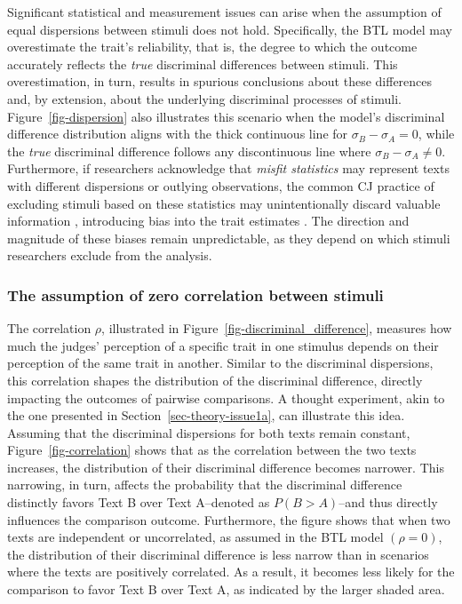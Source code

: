\documentclass[
  authoryear,
  review,
  1p]{elsarticle}
\begin{document}
Significant statistical and measurement issues can arise when the
assumption of equal dispersions between stimuli does not hold.
Specifically, the BTL model may overestimate the trait's reliability,
that is, the degree to which the outcome accurately reflects the
\emph{true} discriminal differences between stimuli. This
overestimation, in turn, results in spurious conclusions about these
differences \citep{McElreath_2020, Wu_et_al_2022} and, by extension,
about the underlying discriminal processes of stimuli.
Figure~\ref{fig-dispersion} also illustrates this scenario when the
model's discriminal difference distribution aligns with the thick
continuous line for \(\sigma_{B}-\sigma_{A}=0\), while the \emph{true}
discriminal difference follows any discontinuous line where
\(\sigma_{B}-\sigma_{A} \neq 0\). Furthermore, if researchers
acknowledge that \emph{misfit statistics} may represent texts with
different dispersions or outlying observations, the common CJ practice
of excluding stimuli based on these statistics may unintentionally
discard valuable information \citep{Miller_2023}, introducing bias into
the trait estimates \citep{Zimmerman_1994, McElreath_2020}. The
direction and magnitude of these biases remain unpredictable, as they
depend on which stimuli researchers exclude from the analysis.

\subsubsection{The assumption of zero correlation between
stimuli}\label{sec-theory-issue1b}

The correlation \(\rho\), illustrated in
Figure~\ref{fig-discriminal_difference}, measures how much the judges'
perception of a specific trait in one stimulus depends on their
perception of the same trait in another. Similar to the discriminal
dispersions, this correlation shapes the distribution of the discriminal
difference, directly impacting the outcomes of pairwise comparisons. A
thought experiment, akin to the one presented in
Section~\ref{sec-theory-issue1a}, can illustrate this idea. Assuming
that the discriminal dispersions for both texts remain constant,
Figure~\ref{fig-correlation} shows that as the correlation between the
two texts increases, the distribution of their discriminal difference
becomes narrower. This narrowing, in turn, affects the probability that
the discriminal difference distinctly favors Text B over Text A--denoted
as \(P(B > A)\)--and thus directly influences the comparison outcome.
Furthermore, the figure shows that when two texts are independent or
uncorrelated, as assumed in the BTL model \((\rho=0)\), the distribution
of their discriminal difference is less narrow than in scenarios where
the texts are positively correlated. As a result, it becomes less likely
for the comparison to favor Text B over Text A, as indicated by the
larger shaded area.
\end{document}
